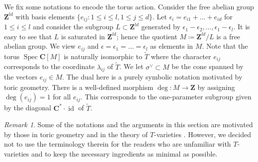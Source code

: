 \documentclass[letterpaper,11pt]{amsart}
\theoremstyle{plain}
\theoremstyle{definition}
\theoremstyle{remark}
\newtheorem{rema}[theo]{Remark}
\newcommand{\eps}{\epsilon}
\newcommand{\CC}{\mathbf{C}}
\newcommand{\ZZ}{\mathbf{Z}}
\newcommand{\sta}{^{*}}
\newcommand{\dual}{^{\vee}}
\DeclareMathOperator{\id}{id}
\DeclareMathOperator{\Spec}{Spec}
\begin{document}
    We fix some notations to encode the torus action. Consider the free abelian group $\ZZ^{ld}$ with basis elements $\{ e_{ij} : 1 \leq i \leq l, 1 \leq j \leq d\}$. Let $\eps_{i} = e_{i1} + \ldots + e_{id}$ for $1 \leq i \leq l$ and consider the subgroup $L \subset \ZZ^{ld}$ generated by $\eps_{1} - \eps_{2},\ldots, \eps_{1} - \eps_{l}$. It is easy to see that $L$ is saturated in $\ZZ^{ld}$; hence the quotient $M \coloneq \ZZ^{ld}/L$ is a free abelian group. We view $e_{ij}$ and $\eps = \eps_{1} = \ldots = \eps_{l}$ as elements in $M$. Note that the torus $\Spec \CC[M]$ is naturally isomorphic to $\widetilde{T}$ where the character $e_{ij}$ corresponds to the coordinate $\lambda_{ij}$ of $\widetilde{T}$. We let $\sigma\dual \subset M$ be the cone spanned by the vectors $e_{ij} \in M$. The dual here is a purely symbolic notation motivated by toric geometry. There is a well-defined morphism $\deg \colon M \to \ZZ$ by assigning $\deg(e_{ij}) = 1$ for all $e_{ij}$. This corresponds to the one-parameter subgroup given by the diagonal $\CC\sta \cdot \id$ of $\widetilde{T}$.

    \begin{rema}
        Some of the notations and the arguments in this section are motivated by those in toric geometry and in the theory of $T$-varieties \cite{AIPSV-T-var}. However, we decided not to use the terminology therein for the readers who are unfamiliar with $T$-varieties and to keep the necessary ingredients as minimal as possible.
    \end{rema}
\end{document}
